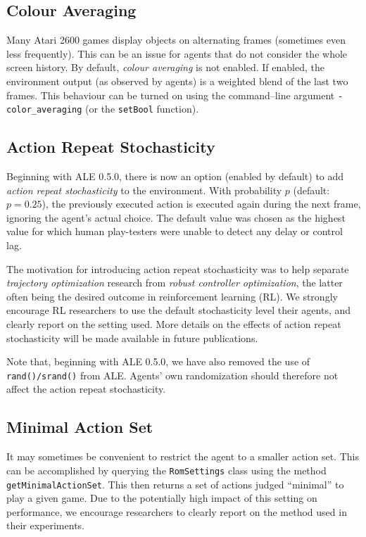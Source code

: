 \documentclass[12pt]{article}
\begin{document}
\subsection{Colour Averaging}

Many Atari 2600 games display objects on alternating frames (sometimes even less frequently).
This can be an issue for agents that do not consider the whole screen history. By default, 
\emph{colour averaging} is not enabled. If enabled, the environment output (as observed by agents)
is a weighted blend of the last two frames. This behaviour can be turned on using the
command--line argument \verb+-color_averaging+ (or the \verb+setBool+ function).

\subsection{Action Repeat Stochasticity}

Beginning with ALE 0.5.0, there is now an option (enabled by default) to add 
\emph{action repeat stochasticity} to the environment. With probability $p$ (default: $p = 0.25$),
the previously executed action is executed again during the next frame, ignoring the agent's
actual choice. The default value was chosen as the highest value for which human play-testers
were unable to detect any delay or control lag.

The motivation for introducing action repeat stochasticity was to help separate \emph{trajectory
optimization} research from \emph{robust controller optimization}, the latter often being the 
desired outcome in reinforcement learning (RL). We strongly encourage RL researchers to use 
the default stochasticity level their agents, and clearly report on the setting used. More 
details on the effects of action repeat stochasticity will be made available in future 
publications.

Note that, beginning with ALE 0.5.0, we have also removed the use of \verb+rand()/srand()+ from
ALE. Agents' own randomization should therefore not affect the action repeat stochasticity.

\subsection{Minimal Action Set}

It may sometimes be convenient to restrict the agent to a smaller action set. This can be
accomplished by querying the \verb+RomSettings+ class using the method 
\verb+getMinimalActionSet+. This then returns a set of actions judged ``minimal'' to play a given
game. Due to the potentially high impact of this setting on performance, we encourage researchers
to clearly report on the method used in their experiments. 
\end{document}
